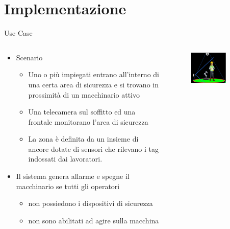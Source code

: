 \documentclass{beamer}
\begin{document}
\section{Implementazione}
\begin{frame}{Use Case}
\begin{columns}
\begin{column}{0.5\textwidth}
\footnotesize
\begin{itemize}
	\item Scenario	
\begin{itemize}
\footnotesize
	\item Uno o più impiegati entrano all’interno di una certa area di sicurezza e si trovano in prossimità di un macchinario attivo
	\item Una telecamera sul soffitto ed una frontale monitorano l’area di sicurezza
	\item La zona è definita da un insieme di ancore dotate di sensori che rilevano i tag indossati dai lavoratori. 
\end{itemize}
	\item Il sistema genera allarme e spegne il macchinario se tutti gli operatori	
\begin{itemize}
\footnotesize
	\item non possiedono i dispositivi di sicurezza
	\item non sono abilitati ad agire sulla macchina
\end{itemize}
\end{itemize}
\end{column}
\begin{column}{0.5\textwidth}
	\begin{figure}	
	\centering
    \includegraphics[width=0.7\textwidth]{images/use-case.png}
    \end{figure}
\end{column}
\end{columns}
\end{frame}
\end{document}
